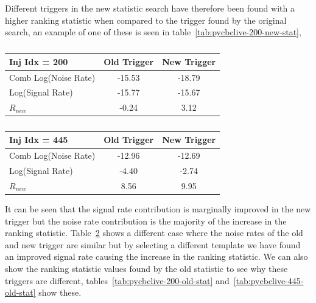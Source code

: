 Different triggers in the new statistic search have therefore been found with a higher ranking statistic when compared to the trigger found by the original search, an example of one of these is seen in table~\ref{tab:pycbclive-200-new-stat},
%
\begin{table}[ht]
    \centering
    \setlength{\tabcolsep}{3pt}
    \begin{minipage}{0.48\textwidth}
        \centering
        \begin{adjustbox}{minipage=\linewidth-0cm, margin=-5.5cm 0pt 0pt 0cm}
        \begin{tabular}{lcc}
            \toprule
            \textbf{Inj Idx = 200} & \textbf{Old Trigger} & \textbf{New Trigger} \\
            \midrule
            Comb Log(Noise Rate)  & -15.53 & -18.79 \\
            Log(Signal Rate) & -15.77 & -15.67 \\
            $R_{new}$ & -0.24 & 3.12 \\
            \bottomrule
        \end{tabular}
        \end{adjustbox}
        \caption{}
        \label{tab:pycbclive-200-new-stat}
    \end{minipage}
    \hfill
    \begin{minipage}{0.48\textwidth}
        \centering
        \begin{tabular}{lcc}
            \toprule
            \textbf{Inj Idx = 445} & \textbf{Old Trigger} & \textbf{New Trigger} \\
            \midrule
            Comb Log(Noise Rate)  & -12.96 & -12.69 \\
            Log(Signal Rate) & -4.40 & -2.74 \\
            $R_{new}$ & 8.56 & 9.95 \\
            \bottomrule
        \end{tabular}
        \caption{}
        \label{tab:pycbclive-445-new-stat}
    \end{minipage}
\end{table}
%
It can be seen that the signal rate contribution is marginally improved in the new trigger but the noise rate contribution is the majority of the increase in the ranking statistic. Table~\ref{tab:pycbclive-445-new-stat} shows a different case where the noise rates of the old and new trigger are similar but by selecting a different template we have found an improved signal rate causing the increase in the ranking statistic. We can also show the ranking statistic values found by the old statistic to see why these triggers are different, tables~\ref{tab:pycbclive-200-old-stat} and~\ref{tab:pycbclive-445-old-stat} show these.
